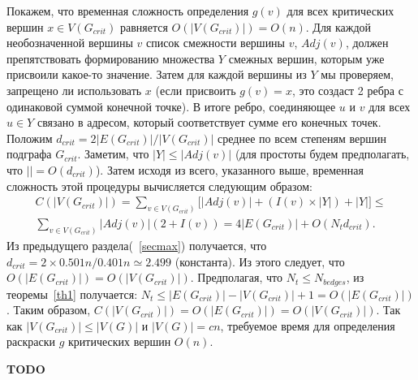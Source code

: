 \documentclass[specialist,
               substylefile = spbu.rtx,
               subf,href,colorlinks=true, 12pt]{disser}
\begin{document}
Покажем, что временная сложность определения $g(v)$ для всех критических вершин $x \in V(G_{crit})$ равняется $\mathit{O}(|V(G_{crit})|) = \mathit{O}(n)$. Для каждой необозначенной вершины $v$ список смежности вершины $v$, $Adj(v)$, должен препятствовать формированию множества $Y$ смежных вершин, которым уже присвоили какое-то значение. Затем для каждой вершины из $Y$ мы проверяем, запрещено ли использовать $x$ (если присвоить $g(v) = x$, это создаст 2 ребра с одинаковой суммой конечной точке). В итоге ребро, соединяющее $u$ и $v$ для всех $u \in Y$ связано в адресом, который соответствует сумме его конечных точек. Положим $d_{crit} = 2|E(G_{crit})|/|V(G_{crit})|$ среднее по всем степеням вершин подграфа $G_{crit}$. Заметим, что $|Y| \leq |Adj(v)|$ (для простоты будем предполагать, что $|| = \mathit{O}(d_{crit})$). Затем исходя из всего, указанного выше, временная сложность этой процедуры вычисляется следующим образом:
\begin{equation}
\begin{split}
\mathit{C}(|V(G_{crit})|) = \sum \limits_{v \in V(G_{crit})}\Big[ |Adj(v)| + (I(v) \times |Y|) + |Y|\Big] \leq \\
\sum \limits_{v \in V(G_{crit})} |Adj(v)|(2 + I(v)) = 4|E(G_{crit})| + \mathit{O}(N_{t}d_{crit}).
\end{split}
\end{equation}
Из предыдущего раздела(~\ref{secmax}) получается, что $d_{crit} = 2 \times 0.501n/0.401n \simeq 2.499$ (константа). Из этого следует, что $\mathit{O}(|E(G_{crit})|) = \mathit{O}(|V(G_{crit})|)$. Предполагая, что $N_{t} \leq N_{bedges}$, из теоремы~\ref{th1} получается: $N_{t} \leq |E(G_{crit})| - |V(G_{crit})| + 1 = \mathit{O}(|E(G_{crit})|)$. Таким образом, $\mathit{C}(|V(G_{crit})|) = \mathit{O}(|E(G_{crit})|) = \mathit{O}(|V(G_{crit})|)$. Так как $|V(G_{crit})| \leq |V(G)|$ и $|V(G)| = cn$, требуемое время для определения раскраски $g$ критических вершин $\mathit{O}(n)$.

\newpage

\conclusion

\textbf{TODO}
\end{document}

